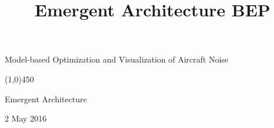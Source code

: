 \documentclass[a4paper,english,fleqn]{exam}
\title{Emergent Architecture BEP}
\newcommand{\cMysename}{Model-based Optimization and Visualization of Aircraft Noise}
\newcommand{\doctitle}{Emergent Architecture}
\newcommand{\deadline}{2 May 2016}
\newcommand{\examdate}{\deadline}
\begin{document}
\thispagestyle{empty}

\begin{center}

\vspace*{2cm}
{\huge \cMysename}

\begin{center}
    \line(1,0){450}
\end{center}

{\LARGE \doctitle}

\vspace{1cm}

{\Large \examdate}

\end{center}
\newpage

\tableofcontents
\newpage





\end{document}
